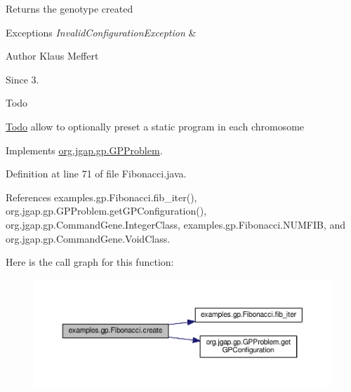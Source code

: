 \begin{DoxyReturn}{Returns}
the genotype created 
\end{DoxyReturn}

\begin{DoxyExceptions}{Exceptions}
{\em Invalid\-Configuration\-Exception} & \\
\hline
\end{DoxyExceptions}
\begin{DoxyAuthor}{Author}
Klaus Meffert 
\end{DoxyAuthor}
\begin{DoxySince}{Since}
3. 
\end{DoxySince}
\begin{DoxyRefDesc}{Todo}
\item[\hyperlink{todo__todo000004}{Todo}]allow to optionally preset a static program in each chromosome \end{DoxyRefDesc}


Implements \hyperlink{classorg_1_1jgap_1_1gp_1_1_g_p_problem_a9c453825ecc8d4f20a6cc17c6c5d78cb}{org.\-jgap.\-gp.\-G\-P\-Problem}.



Definition at line 71 of file Fibonacci.\-java.



References examples.\-gp.\-Fibonacci.\-fib\-\_\-iter(), org.\-jgap.\-gp.\-G\-P\-Problem.\-get\-G\-P\-Configuration(), org.\-jgap.\-gp.\-Command\-Gene.\-Integer\-Class, examples.\-gp.\-Fibonacci.\-N\-U\-M\-F\-I\-B, and org.\-jgap.\-gp.\-Command\-Gene.\-Void\-Class.



Here is the call graph for this function\-:
\nopagebreak
\begin{figure}[H]
\begin{center}
\leavevmode
\includegraphics[width=350pt]{classexamples_1_1gp_1_1_fibonacci_a09f676281515cca71bae669293152c09_cgraph}
\end{center}
\end{figure}


